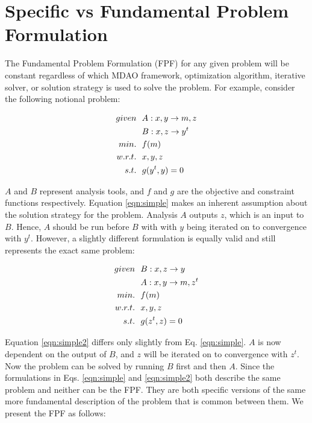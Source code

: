 \section{Specific vs Fundamental Problem Formulation }

    The Fundamental Problem Formulation (FPF) for any given problem will be constant regardless 
    of which MDAO framework, optimization algorithm, iterative solver, or solution strategy
    is used to solve the problem. For example, consider the following notional problem: 

    \begin{align}
        given & \ \ A: {x,y} \rightarrow {m,z} \notag
        \\      & \ \ B: {x,z} \rightarrow {y^t} \notag
        \\min. &\ \ f(m) \notag
        \\w.r.t. & \ \ x,y,z \notag
        \\s.t. & \ \ g(y^t,y) = 0
        \label{eqn:simple}
    \end{align}

    $A$ and $B$ represent analysis tools, and $f$ and $g$ are the objective and constraint functions respectively. 
    Equation \ref{eqn:simple} makes an inherent assumption about the solution strategy for the problem. 
    Analysis $A$ outputs $z$, which is an input to $B$. Hence, $A$ should be run before $B$ with 
    with $y$ being iterated on to convergence with $y^t$. However, a slightly different formulation is 
    equally valid and still represents the exact same problem: 

    \begin{align}
        given & \ \ B: {x,z} \rightarrow {y} \notag
        \\      & \ \ A: {x,y} \rightarrow {m,z^t} \notag
        \\min. &\ \ f(m) \notag
        \\w.r.t. & \ \ x,y,z \notag
        \\s.t. & \ \ g(z^t,z) = 0
        \label{eqn:simple2}
    \end{align}

    Equation \ref{eqn:simple2} differs only slightly from Eq. \ref{eqn:simple}. $A$ is now dependent on the output of $B$, 
    and $z$ will be iterated on to convergence with $z^t$. Now the problem can be solved by running $B$ first and then $A$.
    Since the formulations in Eqs. \ref{eqn:simple} and \ref{eqn:simple2} both describe the same problem and neither can be the
    FPF. They are both specific versions of the same more fundamental description of 
    the problem that is common between them. We present the FPF as follows: 

